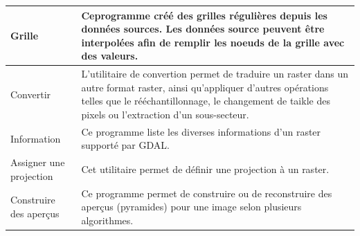 {\begin{longtable}{|p{3cm}|p{13cm}|}
\hline Grille & Ceprogramme créé des grilles régulières depuis les données sources. Les données source peuvent être interpolées afin de remplir les noeuds de la grille avec des valeurs.\\
\hline Convertir & L'utilitaire de convertion permet de traduire un raster dans un autre format raster, ainsi qu'appliquer d'autres opérations telles que le rééchantillonnage, le changement de taikle des pixels ou l'extraction d'un sous-secteur.\\
\hline Information & Ce programme liste les diverses informations d'un raster supporté par GDAL.\\
\hline Assigner une projection & Cet utilitaire permet de définir une projection à un raster.\\
\hline Construire des aperçus & Ce programme permet de construire ou de reconstruire des aperçus (pyramides) pour une image selon plusieurs algorithmes.\\

\end{longtable}}
